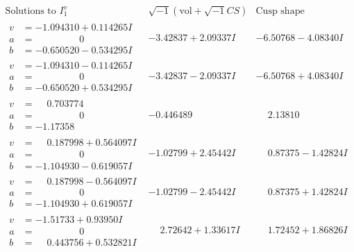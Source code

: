 \documentclass[1p]{elsarticle_modified}
\theoremstyle{definition}
\newcommand{\I}{\sqrt{-1}}
\begin{document}
$$\begin{array}{c|c|c}  
\text{Solutions to }I^v_{1}& \I (\text{vol} + \sqrt{-1}CS) & \text{Cusp shape}\\
 \hline 
\begin{aligned}
v &= -1.094310 + 0.114265 I \\
a &= \phantom{-0.000000 } 0 \\
b &= -0.650520 - 0.534295 I\end{aligned}
 & -3.42837 + 2.09337 I & -6.50768 - 4.08340 I \\ \hline\begin{aligned}
v &= -1.094310 - 0.114265 I \\
a &= \phantom{-0.000000 } 0 \\
b &= -0.650520 + 0.534295 I\end{aligned}
 & -3.42837 - 2.09337 I & -6.50768 + 4.08340 I \\ \hline\begin{aligned}
v &= \phantom{-}0.703774\phantom{ +0.000000I} \\
a &= \phantom{-0.000000 } 0 \\
b &= -1.17358\phantom{ +0.000000I}\end{aligned}
 & -0.446489\phantom{ +0.000000I} & \phantom{-}2.13810\phantom{ +0.000000I} \\ \hline\begin{aligned}
v &= \phantom{-}0.187998 + 0.564097 I \\
a &= \phantom{-0.000000 } 0 \\
b &= -1.104930 - 0.619057 I\end{aligned}
 & -1.02799 + 2.45442 I & \phantom{-}0.87375 - 1.42824 I \\ \hline\begin{aligned}
v &= \phantom{-}0.187998 - 0.564097 I \\
a &= \phantom{-0.000000 } 0 \\
b &= -1.104930 + 0.619057 I\end{aligned}
 & -1.02799 - 2.45442 I & \phantom{-}0.87375 + 1.42824 I \\ \hline\begin{aligned}
v &= -1.51733 + 0.93950 I \\
a &= \phantom{-0.000000 } 0 \\
b &= \phantom{-}0.443756 + 0.532821 I\end{aligned}
 & \phantom{-}2.72642 + 1.33617 I & \phantom{-}1.72452 + 1.86826 I \\ \hline\begin{aligned}

\end{aligned}
\end{array}$$
\end{document}

